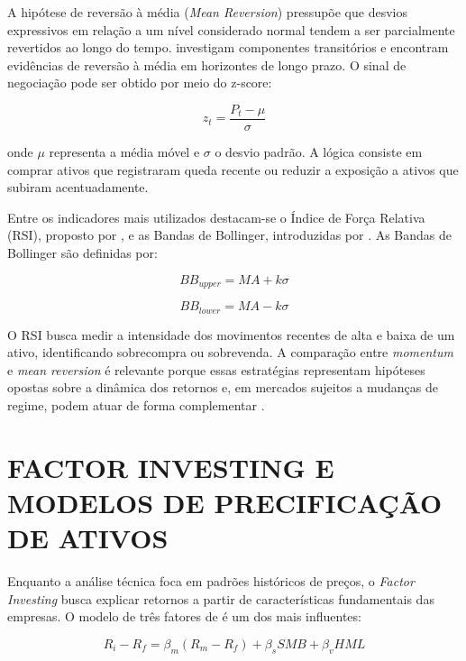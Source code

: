 \documentclass{eic-bcc-tcc}
\begin{document}
A hipótese de reversão à média (\textit{Mean Reversion}) pressupõe que desvios expressivos em relação a um nível considerado normal tendem a ser parcialmente revertidos ao longo do tempo. \citet{PoterbaSummers1988} investigam componentes transitórios e encontram evidências de reversão à média em horizontes de longo prazo. O sinal de negociação pode ser obtido por meio do z-score:

\begin{equation}
z_t = \frac{P_t - \mu}{\sigma}
\end{equation}

onde $\mu$ representa a média móvel e $\sigma$ o desvio padrão. A lógica consiste em comprar ativos que registraram queda recente ou reduzir a exposição a ativos que subiram acentuadamente.

Entre os indicadores mais utilizados destacam-se o Índice de Força Relativa (RSI), proposto por \citet{Wilder1978}, e as Bandas de Bollinger, introduzidas por \citet{Bollinger2001}. As Bandas de Bollinger são definidas por:

\begin{equation}
BB_{upper} = MA + k\sigma
\end{equation}

\begin{equation}
BB_{lower} = MA - k\sigma
\end{equation}

O RSI busca medir a intensidade dos movimentos recentes de alta e baixa de um ativo, identificando sobrecompra ou sobrevenda. A comparação entre \textit{momentum} e \textit{mean reversion} é relevante porque essas estratégias representam hipóteses opostas sobre a dinâmica dos retornos e, em mercados sujeitos a mudanças de regime, podem atuar de forma complementar \citep{JegadeeshTitman1993, PoterbaSummers1988, Moskowitz2012}.

\section{FACTOR INVESTING E MODELOS DE PRECIFICAÇÃO DE ATIVOS}

Enquanto a análise técnica foca em padrões históricos de preços, o \textit{Factor Investing} busca explicar retornos a partir de características fundamentais das empresas. O modelo de três fatores de \citep{FamaFrench1993} é um dos mais influentes:

\begin{equation}
R_i - R_f = \beta_m (R_m - R_f) + \beta_s SMB + \beta_v HML
\end{equation}
\end{document}
